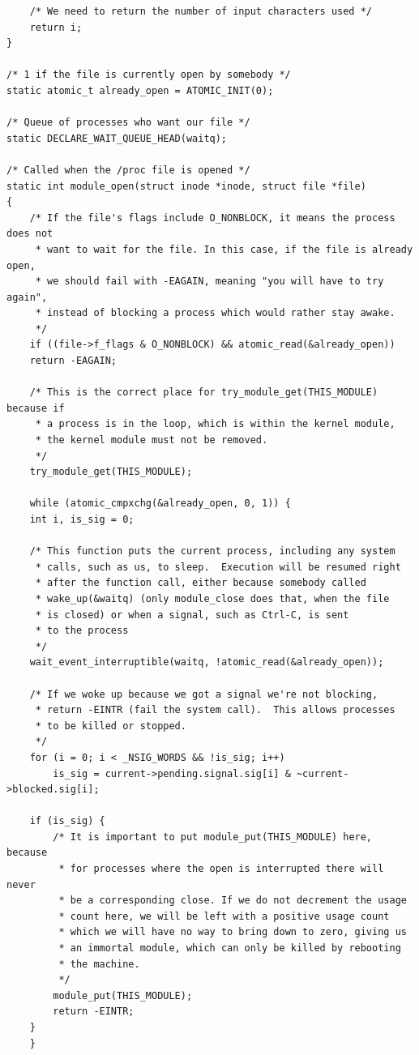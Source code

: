 \documentclass[11pt]{article}
\begin{document}
\begin{verbatim}
    /* We need to return the number of input characters used */
    return i;
}

/* 1 if the file is currently open by somebody */
static atomic_t already_open = ATOMIC_INIT(0);

/* Queue of processes who want our file */
static DECLARE_WAIT_QUEUE_HEAD(waitq);

/* Called when the /proc file is opened */
static int module_open(struct inode *inode, struct file *file)
{
    /* If the file's flags include O_NONBLOCK, it means the process does not
     * want to wait for the file. In this case, if the file is already open,
     * we should fail with -EAGAIN, meaning "you will have to try again",
     * instead of blocking a process which would rather stay awake.
     */
    if ((file->f_flags & O_NONBLOCK) && atomic_read(&already_open))
	return -EAGAIN;

    /* This is the correct place for try_module_get(THIS_MODULE) because if
     * a process is in the loop, which is within the kernel module,
     * the kernel module must not be removed.
     */
    try_module_get(THIS_MODULE);

    while (atomic_cmpxchg(&already_open, 0, 1)) {
	int i, is_sig = 0;

	/* This function puts the current process, including any system
	 * calls, such as us, to sleep.  Execution will be resumed right
	 * after the function call, either because somebody called
	 * wake_up(&waitq) (only module_close does that, when the file
	 * is closed) or when a signal, such as Ctrl-C, is sent
	 * to the process
	 */
	wait_event_interruptible(waitq, !atomic_read(&already_open));

	/* If we woke up because we got a signal we're not blocking,
	 * return -EINTR (fail the system call).  This allows processes
	 * to be killed or stopped.
	 */
	for (i = 0; i < _NSIG_WORDS && !is_sig; i++)
	    is_sig = current->pending.signal.sig[i] & ~current->blocked.sig[i];

	if (is_sig) {
	    /* It is important to put module_put(THIS_MODULE) here, because
	     * for processes where the open is interrupted there will never
	     * be a corresponding close. If we do not decrement the usage
	     * count here, we will be left with a positive usage count
	     * which we will have no way to bring down to zero, giving us
	     * an immortal module, which can only be killed by rebooting
	     * the machine.
	     */
	    module_put(THIS_MODULE);
	    return -EINTR;
	}
    }


\end{verbatim}
\end{document}
